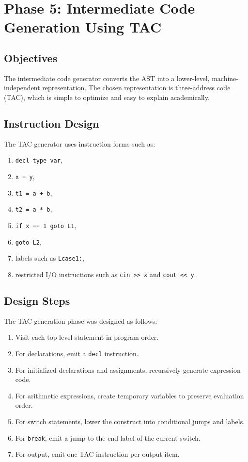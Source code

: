 \documentclass[12pt,a4paper]{article}
\begin{document}
\section{Phase 5: Intermediate Code Generation Using TAC}
\subsection{Objectives}
The intermediate code generator converts the AST into a lower-level, machine-independent representation. The chosen representation is three-address code (TAC), which is simple to optimize and easy to explain academically.

\subsection{Instruction Design}
The TAC generator uses instruction forms such as:

\begin{enumerate}
    \item \texttt{decl type var},
    \item \texttt{x = y},
    \item \texttt{t1 = a + b},
    \item \texttt{t2 = a * b},
    \item \texttt{if x == 1 goto L1},
    \item \texttt{goto L2},
    \item labels such as \texttt{Lcase1:},
    \item restricted I/O instructions such as \texttt{cin >> x} and \texttt{cout << y}.
\end{enumerate}

\subsection{Design Steps}
The TAC generation phase was designed as follows:

\begin{enumerate}
    \item Visit each top-level statement in program order.
    \item For declarations, emit a \texttt{decl} instruction.
    \item For initialized declarations and assignments, recursively generate expression code.
    \item For arithmetic expressions, create temporary variables to preserve evaluation order.
    \item For switch statements, lower the construct into conditional jumps and labels.
    \item For \texttt{break}, emit a jump to the end label of the current switch.
    \item For output, emit one TAC instruction per output item.
\end{enumerate}
\end{document}
